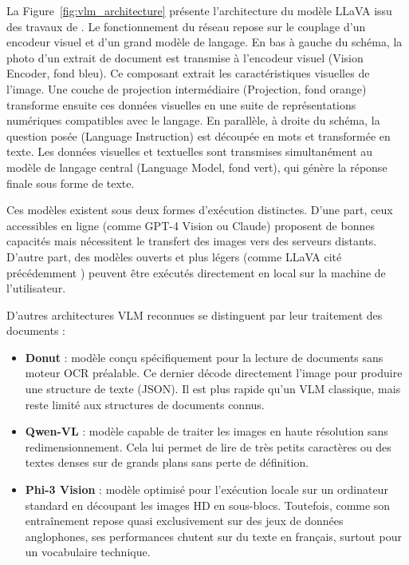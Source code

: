 La Figure~\ref{fig:vlm_architecture} présente l'architecture  du modèle LLaVA issu des travaux de \citet{liu_llava_2024}. Le fonctionnement du réseau repose sur le couplage d'un encodeur visuel et d'un grand modèle de langage. En bas à gauche du schéma, la photo d'un extrait de document est transmise à l'encodeur visuel (Vision Encoder, fond bleu). Ce composant extrait les caractéristiques visuelles de l'image. Une couche de projection intermédiaire (Projection, fond orange) transforme ensuite ces données visuelles en une suite de représentations numériques compatibles avec le langage. En parallèle, à droite du schéma, la question posée (Language Instruction) est découpée en mots et transformée en texte. Les données visuelles et textuelles sont transmises simultanément au modèle de langage central (Language Model, fond vert), qui génère la réponse finale sous forme de texte.

Ces modèles existent sous deux formes d'exécution distinctes. D'une part, ceux accessibles en ligne (comme GPT-4 Vision ou Claude) proposent de bonnes capacités mais nécessitent le transfert des images vers des serveurs distants. D'autre part, des modèles ouverts et plus légers (comme LLaVA cité précédemment \citep{liu_llava_2024}) peuvent être exécutés directement en local sur la machine de l'utilisateur.

D'autres architectures VLM reconnues se distinguent par leur traitement des documents :
\begin{itemize}
  \item \textbf{Donut} \citep{kim_donut_2022} : modèle conçu spécifiquement pour la lecture de documents sans moteur OCR préalable. Ce dernier décode directement l'image pour produire une structure de texte (JSON). Il est plus rapide qu'un VLM classique, mais reste limité aux structures de documents connus.
  \item \textbf{Qwen-VL} \citep{bai_qwenvl_2023} : modèle capable de traiter les images en haute résolution sans redimensionnement. Cela lui permet de lire de très petits caractères ou des textes denses sur de grands plans sans perte de définition.
  \item \textbf{Phi-3 Vision} \citep{abdin_phi3_2024} : modèle optimisé pour l'exécution locale sur un ordinateur standard en découpant les images HD en sous-blocs. Toutefois, comme son entraînement repose quasi exclusivement sur des jeux de données anglophones, ses performances chutent sur du texte en français, surtout pour un vocabulaire technique.
\end{itemize}

